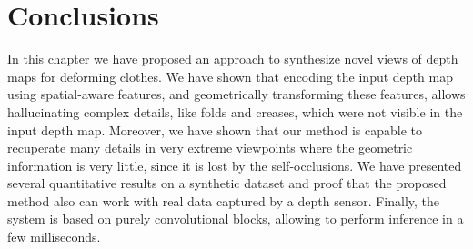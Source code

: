 \section{Conclusions}

In this chapter we have proposed an approach to synthesize novel views of depth maps for deforming clothes. We have shown that encoding the input depth map using spatial-aware features, and geometrically transforming these features, allows hallucinating complex details, like folds and creases, which were not visible in the input depth map. Moreover, we have shown that our method is capable to recuperate many details in very extreme viewpoints where the geometric information is very little, since it is lost by the self-occlusions.
We have presented several quantitative results on a synthetic dataset and proof that the proposed method also can work with real data captured by a depth sensor. Finally, the system is based on purely convolutional blocks, allowing to  perform inference in a few milliseconds.